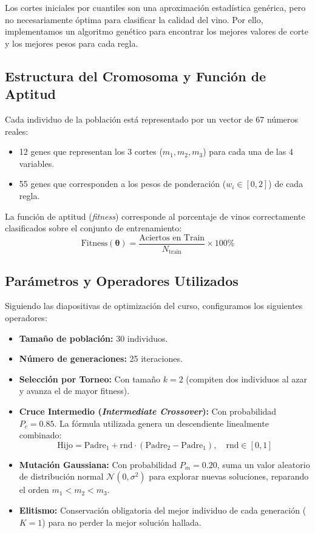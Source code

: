\documentclass[11pt,a4paper]{article}
\begin{document}
Los cortes iniciales por cuantiles son una aproximación estadística genérica, pero no necesariamente óptima para clasificar la calidad del vino. Por ello, implementamos un algoritmo genético para encontrar los mejores valores de corte y los mejores pesos para cada regla.

\subsection{Estructura del Cromosoma y Función de Aptitud}
Cada individuo de la población está representado por un vector de 67 números reales:
\begin{itemize}[noitemsep]
    \item 12 genes que representan los 3 cortes ($m_1, m_2, m_3$) para cada una de las 4 variables.
    \item 55 genes que corresponden a los pesos de ponderación ($w_i \in [0, 2]$) de cada regla.
\end{itemize}
La función de aptitud (\textit{fitness}) corresponde al porcentaje de vinos correctamente clasificados sobre el conjunto de entrenamiento:
\begin{equation}
\text{Fitness}(\boldsymbol{\theta}) = \frac{\text{Aciertos en Train}}{N_{\text{train}}} \times 100\%
\end{equation}

\subsection{Parámetros y Operadores Utilizados}
Siguiendo las diapositivas de optimización del curso, configuramos los siguientes operadores:
\begin{itemize}[noitemsep]
    \item \textbf{Tamaño de población:} 30 individuos.
    \item \textbf{Número de generaciones:} 25 iteraciones.
    \item \textbf{Selección por Torneo:} Con tamaño $k=2$ (compiten dos individuos al azar y avanza el de mayor fitness).
    \item \textbf{Cruce Intermedio (\textit{Intermediate Crossover}):} Con probabilidad $P_c = 0.85$. La fórmula utilizada genera un descendiente linealmente combinado:
    \begin{equation}
    \text{Hijo} = \text{Padre}_1 + \text{rnd} \cdot (\text{Padre}_2 - \text{Padre}_1), \quad \text{rnd} \in [0, 1]
    \end{equation}
    \item \textbf{Mutación Gaussiana:} Con probabilidad $P_m = 0.20$, suma un valor aleatorio de distribución normal $\mathcal{N}(0, \sigma^2)$ para explorar nuevas soluciones, reparando el orden $m_1 < m_2 < m_3$.
    \item \textbf{Elitismo:} Conservación obligatoria del mejor individuo de cada generación ($K=1$) para no perder la mejor solución hallada.
\end{itemize}
\end{document}
